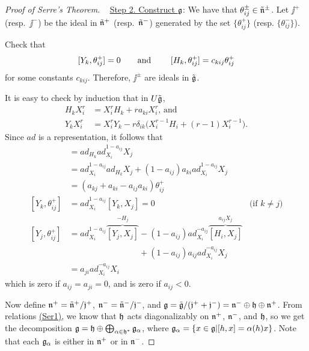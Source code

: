 \begin{proof}[Proof of Serre's Theorem]{\ }
  \underline{Step 2. Construct $\mathfrak{g}$}: We have that $\theta_{ij}^\pm \in \tilde {\mathfrak{n}}^\pm$. Let
  $\jj^+$ (resp.\ $\jj^-$) be the ideal in $\tilde{\mathfrak{n}}^+$ (resp.\
  $\tilde{\mathfrak{n}}^-$) generated by the set $\{\theta_{ij}^+\}$ (resp. $\{\theta_{ij}^-\}$).
  \begin{exercise}
    Check that
    \[
        [Y_k,\theta_{ij}^+]=0 \text{\qquad and \qquad} [H_k,\theta_{ij}^+]=c_{kij}\theta_{ij}^+
    \]
    for some constants $c_{kij}$. Therefore, $\jj^\pm$ are ideals in $\tilde {\mathfrak{g}}$.
    \begin{solution}
      It is easy to check by induction that in $U\tilde {\mathfrak{g}}$,
      \begin{align*}
        H_k X_i^r &= X_i^r H_k + ra_{ki}X_i^r\text{, and}\\
        Y_kX_i^r &= X_i^rY_k - r\delta_{ik}\bigl(X_i^{r-1}H_i +(r-1)X_i^{r-1}\bigr).
      \end{align*}
      Since $ad$ is a representation, it follows that
      \begin{align*}
        [H_k,\theta_{ij}^+] &= ad_{H_k}ad_{X_i}^{1-a_{ij}}X_j\\
            &= ad_{X_i}^{1-a_{ij}} ad_{H_k}X_j +
            (1-a_{ij})a_{ki}ad_{X_i}^{1-a_{ij}}X_j\\
            &= (a_{kj}+a_{ki}-a_{ij}a_{ki})\theta_{ij}^+\\
        [Y_k,\theta_{ij}^+] &= ad_{X_i}^{1-a_{ij}}[Y_k,X_j] = 0&\text{(if $k\neq
                j$)}\\
        [Y_j,\theta_{ij}^+] &=
            ad_{X_i}^{1-a_{ij}}\overbrace{[Y_j,X_j]}^{-H_j}
            -(1-a_{ij})ad_{X_i}^{-a_{ij}}\overbrace{[H_i,X_j]}^{a_{ij}X_j} \\
            &\phantom{=ad_{X_i}^{1-a_{ij}}[Y_j,X_j]}
                +(1-a_{ij})a_{ij}ad_{X_i}^{-a_{ij}}X_j\\
            &=a_{ji}ad_{X_i}^{-a_{ij}}X_i
      \end{align*}
      which is zero if $a_{ij}=a_{ji}=0$, and is zero if $a_{ij}<0$.
    \end{solution}
  \end{exercise}
  Now define $\mathfrak{n}^+=\tilde{\mathfrak{n}}^+/\mathfrak{j}^+$, $\mathfrak{n}^-=\tilde{\mathfrak{n}}^-/\mathfrak{j}^-$, and $\mathfrak{g} =
  \tilde{\mathfrak{g}}/(\mathfrak{j}^++\mathfrak{j}^-) = \mathfrak{n}^-\oplus \mathfrak{h}\oplus \mathfrak{n}^+$. From relations
  \hyperlink{Serre}{(Ser1)}, we know that $\mathfrak{h}$ acts diagonalizably on $\mathfrak{n}^+$, $\mathfrak{n}^-$,
  and $\mathfrak{h}$, so we get the decomposition $\mathfrak{g} = \mathfrak{h}\oplus \bigoplus_{\alpha\in \mathfrak{h}^*}
  \mathfrak{g}_\alpha$, where $\mathfrak{g}_\alpha = \{x\in \mathfrak{g}| [h,x]=\alpha(h)x\}$. Note that each
  $\mathfrak{g}_\alpha$ is either in $\mathfrak{n}^+$ or in $\mathfrak{n}^-$.


\end{proof}
